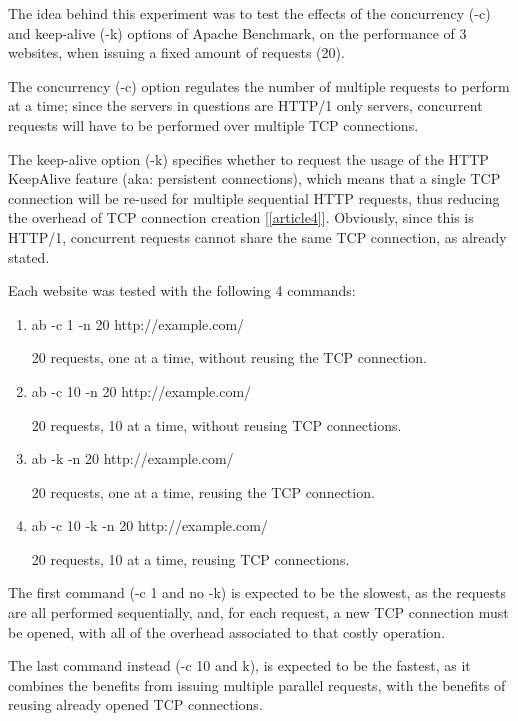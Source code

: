 \documentclass[a4paper,10pt]{article}
\begin{document}
The idea behind this experiment was to test the effects of the concurrency (-c) and keep-alive (-k) options of Apache Benchmark, on the performance of 3 websites, when issuing a fixed amount of requests (20). 

The concurrency (-c) option regulates the number of multiple requests to perform at a time; since the servers in questions are HTTP/1 only servers, concurrent requests will have to be performed over multiple TCP connections. 

The keep-alive option (-k) specifies whether to request the usage of the HTTP KeepAlive feature (aka: persistent connections), which means that a single TCP connection will be re-used for multiple sequential HTTP requests, thus reducing the overhead of TCP connection creation [\ref{article4}]. Obviously, since this is HTTP/1, concurrent requests cannot share the same TCP connection, as already stated.


Each website was tested with the following 4 commands:


\begin{enumerate}


\item ab -c 1 -n 20 http://example.com/

20 requests, one at a time, without reusing the TCP connection.

\item ab -c 10 -n 20 http://example.com/

20 requests, 10 at a time, without reusing TCP connections.

\item ab -k -n 20 http://example.com/

20 requests, one at a time, reusing the TCP connection.


\item ab -c 10 -k -n 20 http://example.com/

20 requests, 10 at a time, reusing TCP connections.


\end{enumerate}



The first command (-c 1 and no -k) is expected to be the slowest, as the requests are all performed sequentially, and, for each request, a new TCP connection must be opened, with all of the overhead associated to that costly operation. 

The last command instead (-c 10 and k), is expected to be the fastest, as it combines the benefits from issuing multiple parallel requests, with the benefits of reusing already opened TCP connections.
\end{document}
